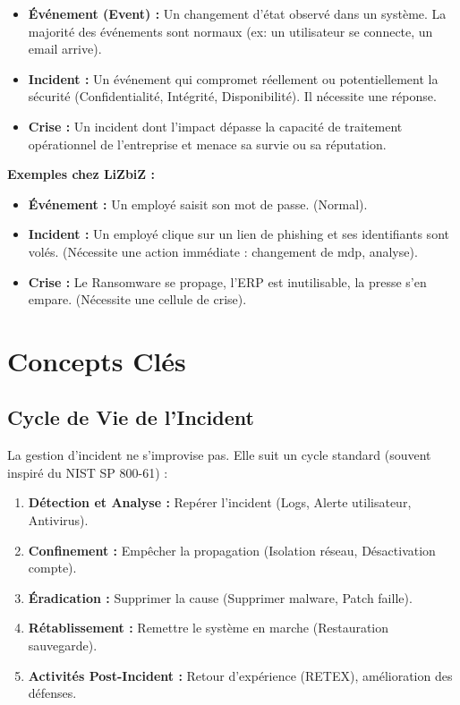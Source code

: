 \begin{boxdef}
\begin{itemize}
    \item \textbf{Événement (Event) :} Un changement d’état observé dans un système. La majorité des événements sont normaux (ex: un utilisateur se connecte, un email arrive).
    \item \textbf{Incident :} Un événement qui compromet réellement ou potentiellement la sécurité (Confidentialité, Intégrité, Disponibilité). Il nécessite une réponse.
    \item \textbf{Crise :} Un incident dont l'impact dépasse la capacité de traitement opérationnel de l'entreprise et menace sa survie ou sa réputation.
\end{itemize}
\end{boxdef}

\begin{boxlizbiz}
\textbf{Exemples chez LiZbiZ :}
\begin{itemize}
    \item \textbf{Événement :} Un employé saisit son mot de passe. (Normal).
    \item \textbf{Incident :} Un employé clique sur un lien de phishing et ses identifiants sont volés. (Nécessite une action immédiate : changement de mdp, analyse).
    \item \textbf{Crise :} Le Ransomware se propage, l'ERP est inutilisable, la presse s'en empare. (Nécessite une cellule de crise).
\end{itemize}
\end{boxlizbiz}

\section{Concepts Clés}

\subsection{Cycle de Vie de l'Incident}

La gestion d'incident ne s'improvise pas. Elle suit un cycle standard (souvent inspiré du NIST SP 800-61) :

\begin{enumerate}
    \item \textbf{Détection et Analyse :} Repérer l'incident (Logs, Alerte utilisateur, Antivirus).
    \item \textbf{Confinement :} Empêcher la propagation (Isolation réseau, Désactivation compte).
    \item \textbf{Éradication :} Supprimer la cause (Supprimer malware, Patch faille).
    \item \textbf{Rétablissement :} Remettre le système en marche (Restauration sauvegarde).
    \item \textbf{Activités Post-Incident :} Retour d'expérience (RETEX), amélioration des défenses.
\end{enumerate}

